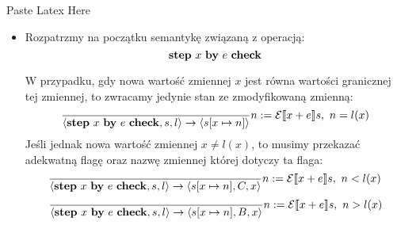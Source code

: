 Paste Latex Here\documentclass{article}
\begin{document}
\begin{itemize}
	\item
	      Rozpatrzmy na początku semantykę związaną z operacją:
	      $$
	      {\bf step} \ x \ {\bf by } \ e \ {\bf check}
	      $$

	      W przypadku, gdy nowa wartość zmiennej $x$ jest równa wartości granicznej tej zmiennej, to zwracamy jedynie stan ze zmodyfikowaną zmienną:
	      $$
	      \frac {
	      	\\
	      	} {
	      	\langle {\bf step} \ x \ {\bf by } \ e \ {\bf check}, s, l \rangle
	      	\rightarrow \langle s[x\mapsto n] \rangle
	      }
	      n := \mathcal{E} \llbracket x + e \rrbracket s, \
	      n = l(x)
	      $$
	      Jeśli jednak nowa wartość zmiennej $x\neq l(x)$, to musimy przekazać adekwatną flagę oraz nazwę zmiennej której dotyczy ta flaga:
	      $$
	      \frac {
	      	\\
	      	} {
	      	\langle {\bf step} \ x \ {\bf by } \ e \ {\bf check}, s, l \rangle
	      	\rightarrow \langle s[x\mapsto n], C, x \rangle
	      }
	      n := \mathcal{E} \llbracket x + e \rrbracket s, \
	      n < l(x)
	      $$
	      $$
	      \frac {
	      	\\
	      	} {
	      	\langle {\bf step} \ x \ {\bf by } \ e \ {\bf check}, s, l \rangle
	      	\rightarrow \langle s[x\mapsto n], B, x \rangle
	      }
	      n := \mathcal{E} \llbracket x + e \rrbracket s, \
	      n > l(x)
	      $$



\end{itemize}
\end{document}
